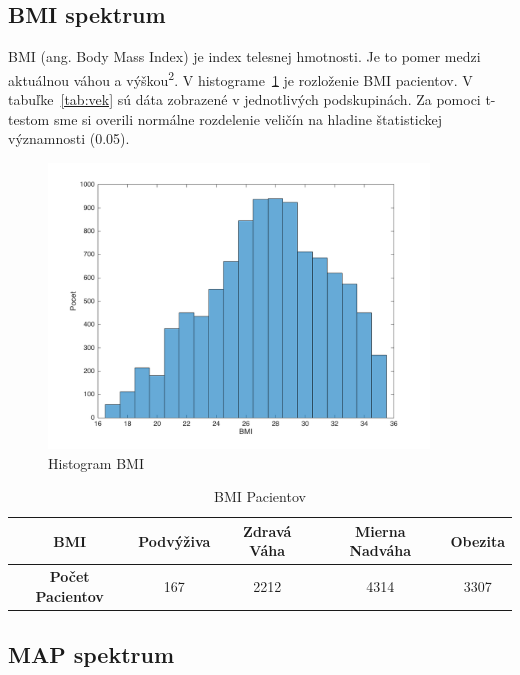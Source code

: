 \subsection{BMI spektrum}

BMI (ang. Body Mass Index) je index telesnej hmotnosti. Je to pomer medzi aktuálnou váhou a výškou\textsuperscript 2. V histograme~\ref{fig:hist-bmi} je rozloženie BMI pacientov. V tabuľke~\ref{tab:vek} sú dáta zobrazené v jednotlivých podskupinách. Za pomoci t-testom sme si overili normálne rozdelenie veličín na hladine štatistickej významnosti (0.05).

\begin{figure}[h!]
	\centering
  		\includegraphics[width=0.9\textwidth]{histBmi.png}
  	\caption{Histogram BMI}
  	\label{fig:hist-bmi}
\end{figure}

\begin{table}[h!]
\centering
\begin{tabular}{c|cccc}
\hline
\textbf{BMI} & Podvýživa & Zdravá Váha & Mierna Nadváha & Obezita \\ \hline
\textbf{Počet Pacientov} & 167       & 2212        & 4314           & 3307    \\ \hline
\end{tabular}
\caption{BMI Pacientov}
\label{tab:bmi}
\end{table}






\subsection{MAP spektrum}

